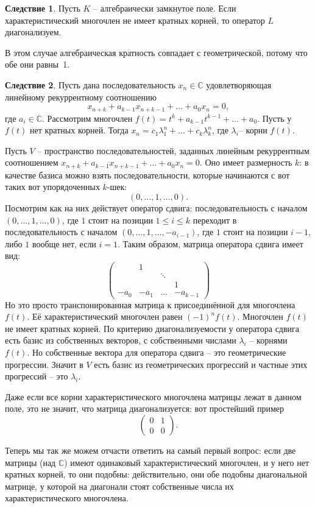 \documentclass[10pt,a4paper,oneside]{book}
\theoremstyle{definition}
\newtheorem{cor}{\color{green!45!black}Следствие}
\renewcommand{\leq}{\leqslant}
\newcommand{\mb}[1]{\mathbb{#1}}
\def\crl{\begin{cor}}
\def\ecrl{\end{cor}}
\def\pmat{\begin{pmatrix}}
\def\epmat{\end{pmatrix}}
\begin{document}
\crl Пусть $K$ -- алгебраически замкнутое поле. Если характеристический многочлен не имеет кратных корней, то оператор $L$ диагонализуем.
\ecrl
\proof В этом случае алгебраическая кратность совпадает с геометрической, потому что обе они равны~1.
\endproof






\crl Пусть дана последовательность $x_n\in \mb C$ удовлетворяющая линейному рекуррентному соотношению 
$$x_{n+k}+a_{k-1}x_{n+k-1}+\dots+a_0x_n=0,$$
где $a_i \in \mb C$. Рассмотрим многочлен $f(t)=t^k+a_{k-1}t^{k-1}+\dots+a_0$. Пусть у $f(t)$ нет кратных корней. Тогда $x_n=c_1 \lambda_1^n+\dots+c_k\lambda_k^n$, где $\lambda_i$-- корни $f(t)$.
\ecrl

\proof Пусть $V$ -- пространство последовательностей, заданных линейным рекуррентным соотношением $x_{n+k}+a_{k-1}x_{n+k-1}+\dots+a_0x_n=0$. Оно имеет размерность $k$: в качестве базиса можно взять последовательности, которые начинаются с вот таких вот упорядоченных $k$-шек:
$$(0,\dots,1,\dots,0).$$
Посмотрим как на них действует оператор сдвига: последовательность с началом $(0,\dots,1,\dots,0)$, где $1$ стоит на позиции $1\leq i\leq k$ переходит в последовательность с началом $(0,\dots,1,\dots, -a_{i-1})$, где $1$ стоит на позиции $i-1$, либо $1$ вообще нет, если $i=1$.
Таким образом, матрица оператора сдвига имеет вид: 
$$ \pmat 
&1&& \\
&&\ddots&\\
&&&1 \\
-a_0 & -a_1& \dots & -a_{k-1}
\epmat $$
Но это просто транспонированная матрица к присоединённой для многочлена $f(t)$. Её характеристический многочлен равен $(-1)^nf(t)$. Многочлен $f(t)$ не имеет кратных корней.  По критерию диагонализуемости у оператора сдвига есть базис из собственных векторов, с собственными числами $\lambda_i$ -- корнями $f(t)$. Но собственные вектора для оператора сдвига -- это геометрические прогрессии. Значит в $V$ есть базис из геометрических прогрессий и частные этих прогрессий -- это $\lambda_i$.
\endproof

Даже если все корни характеристического многочлена матрицы  лежат в данном поле, это не значит, что матрица диагонализуется: вот простейший пример 
$$\pmat 0&1\\ 0&0 \epmat.$$

Теперь мы так же можем отчасти ответить на самый первый вопрос: если две матрицы (над $\mb C$) имеют одинаковый характеристический многочлен, и у него нет кратных корней, то они подобны: действительно, они обе подобны диагональной матрице, у которой на диагонали стоят собственные числа их характеристического многочлена.
\end{document}
